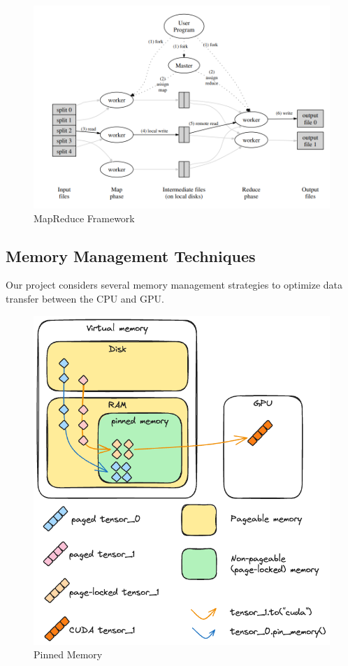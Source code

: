 \documentclass{article}
\begin{document}
\begin{figure}[ht]
    \centering
    \includegraphics[width=1\linewidth]{./images/mapreduce.png}
    \caption{MapReduce Framework \cite{mapreduce}}
    \label{fig:mapreduce}
\end{figure}

\subsection{Memory Management Techniques}
Our project considers several memory management strategies to optimize data transfer between the CPU and GPU.

\begin{figure}[ht]
    \centering
    \includegraphics[width=.8\linewidth]{./images/pinmem.png}
    \caption{Pinned Memory \cite{pinned_memory}}
    \label{fig:mapreduce}
\end{figure}
\end{document}
